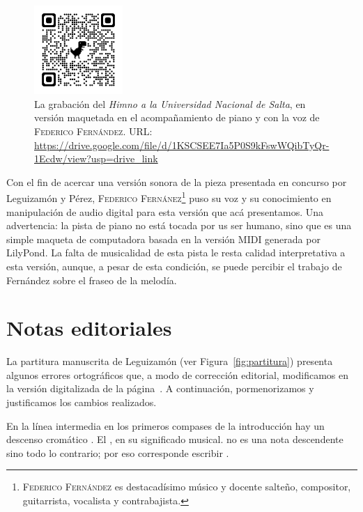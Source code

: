 \begin{figure}[H]
\centering
\includegraphics[width=0.3\textwidth]{img/qrcode-himno-fernandez}
\caption[La grabación del \emph{Himno}.]{La grabación del \emph{Himno a la Universidad Nacional de Salta}, en versión maquetada en el acompañamiento de piano y con la voz de \textsc{Federico Fernández}. URL: \url{https://drive.google.com/file/d/1KSCSEE7Ia5P0S9kFswWQibTyQr-1Ecdw/view?usp=drive_link}}
\label{fig:grabacion}
\end{figure}

Con el fin de acercar una versión sonora de la pieza presentada en concurso por Leguizamón y Pérez, \textsc{Federico Fernánez}\footnote{\textsc{Federico Fernández} es destacadísimo músico y docente salteño, compositor, guitarrista, vocalista y contrabajista.} puso su voz y su conocimiento en manipulación de audio digital para esta versión que acá presentamos. Una advertencia: la pista de piano no está tocada por us ser humano, sino que es una simple maqueta de computadora basada en la versión MIDI generada por LilyPond. La falta de musicalidad de esta pista le resta calidad interpretativa a esta versión, aunque, a pesar de esta condición, se puede percibir el trabajo de Fernández sobre el fraseo de la melodía.


\section{Notas editoriales}
\label{sec:notas-editoriales}

La partitura manuscrita de Leguizamón (ver Figura~\ref{fig:partitura}) presenta algunos errores ortográficos que, a modo de corrección editorial, modificamos en la versión digitalizada de la página~\pageref{partitura-digitalizada}. A continuación, pormenorizamos y justificamos los cambios realizados.

En la línea intermedia en los primeros compases de la introducción hay un descenso cromático \hbox{.} El \hbox{,} en su significado musical. no es una nota descendente sino todo lo contrario; por eso corresponde escribir \hbox{.}


